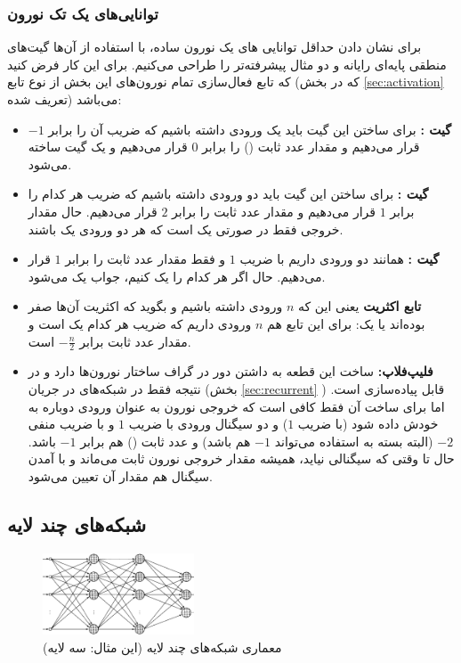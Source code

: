 \documentclass[11pt,a4paper,twocolumn]{article}
\begin{document}
\subsubsection{توانایی‌های یک تک نورون}
برای نشان دادن حداقل توانایی های یک نورون ساده، با استفاده از آن‌ها گیت‌های منطقی پایه‌ای رایانه و دو مثال پیشرفته‌تر را طراحی می‌کنیم. برای این کار فرض کنید که تابع فعال‌سازی تمام نورون‌های این بخش از نوع تابع 
(که در بخش
\ref{sec:activation}
تعریف شده) می‌باشد:
\begin{itemize}
  \item
\textbf{گیت :}
برای ساختن این گیت باید یک ورودی داشته باشیم که ضریب آن را برابر $-1$ قرار می‌دهیم و  مقدار عدد ثابت () را برابر $0$ قرار می‌دهیم و یک گیت  ساخته می‌شود.
  \item
\textbf{گیت :}
برای ساختن این گیت باید دو ورودی داشته باشیم که ضریب هر کدام را برابر $1$ قرار می‌دهیم و  مقدار عدد ثابت را برابر $2$ قرار می‌دهیم. حال مقدار خروجی فقط در صورتی یک است که هر دو ورودی یک باشند.
  \item
\textbf{گیت :}
همانند  دو ورودی داریم با ضریب $1$ و فقط  مقدار عدد ثابت را برابر $1$ قرار می‌دهیم. حال اگر هر کدام را یک کنیم، جواب یک می‌شود.
  \item
\textbf{تابع اکثریت}
یعنی این که $n$ ورودی داشته باشیم و بگوید که اکثریت آن‌ها صفر بوده‌اند یا یک: برای این تابع هم $n$ ورودی داریم که ضریب هر کدام یک است و مقدار عدد ثابت برابر 
$-\frac{n}{2}$
است.
  \item
\textbf{فلیپ‌فلاپ:}
\label{sec:single-neuron}
ساخت این قطعه به داشتن دور در گراف ساختار نورون‌ها دارد و در نتیجه فقط در شبکه‌های در جریان (بخش
\ref{sec:recurrent}
)
قابل پیاده‌سازی است. اما برای ساخت آن فقط کافی است که خروجی نورون به عنوان ورودی دوباره به خودش داده شود (با ضریب $1$) و دو سیگنال ورودی  با ضریب $1$ و  با ضریب منفی $-2$ (البته بسته به استفاده می‌تواند $-1$ هم باشد) و عدد ثابت () هم برابر $-1$ باشد. حال تا وقتی که سیگنالی نیاید، همیشه مقدار خروجی نورون ثابت می‌ماند و با آمدن سیگنال هم مقدار آن تعیین می‌شود.
\end{itemize}

\subsection{شبکه‌های چند لایه}

\begin{figure}
  \centering
    \includegraphics[width=0.4\textwidth]{multilayer.png}
  \caption{ معماری شبکه‌های چند لایه (این مثال: سه لایه)}
  \label{fig:multilayer}
\end{figure}
\end{document}
